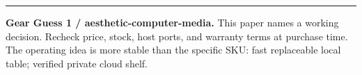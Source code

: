 \documentclass[10pt,letterpaper]{article}
\begin{document}
\vfill
{\color{acpink}\rule{\linewidth}{1pt}}\par
{\small\sffamily
\textbf{Gear Guess 1 / aesthetic-computer-media.}
This paper names a working decision. Recheck price, stock, host ports, and
warranty terms at purchase time. The operating idea is more stable than the
specific SKU: fast replaceable local table; verified private cloud shelf.}
\end{document}
